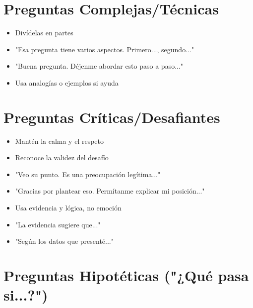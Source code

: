 \documentclass[a4paper,11pt]{article}
\begin{document}
\section{Preguntas Complejas/Técnicas}

\begin{itemize}

  \item Divídelas en partes

  \item "Esa pregunta tiene varios aspectos. Primero..., segundo..."

  \item "Buena pregunta. Déjenme abordar esto paso a paso..."

  \item Usa analogías o ejemplos si ayuda

\end{itemize}

\vspace{0.2cm}

\section{Preguntas Críticas/Desafiantes}

\begin{itemize}

  \item Mantén la calma y el respeto

  \item Reconoce la validez del desafío

  \item "Veo su punto. Es una preocupación legítima..."

  \item "Gracias por plantear eso. Permítanme explicar mi posición..."

  \item Usa evidencia y lógica, no emoción

  \item "La evidencia sugiere que..."

  \item "Según los datos que presenté..."

\end{itemize}

\vspace{0.2cm}

\section{Preguntas Hipotéticas ("¿Qué pasa si...?")}
\end{document}
